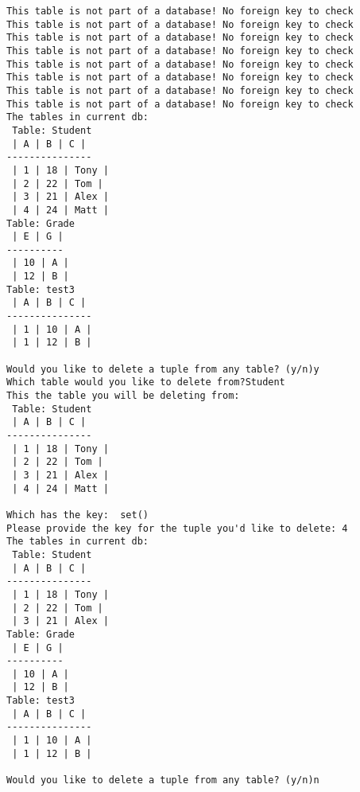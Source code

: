 \documentclass[11pt]{article}
\begin{document}
    \begin{Verbatim}[commandchars=\\\{\}]
This table is not part of a database! No foreign key to check
This table is not part of a database! No foreign key to check
This table is not part of a database! No foreign key to check
This table is not part of a database! No foreign key to check
This table is not part of a database! No foreign key to check
This table is not part of a database! No foreign key to check
This table is not part of a database! No foreign key to check
This table is not part of a database! No foreign key to check
The tables in current db: 
 Table: Student
 | A | B | C |
---------------
 | 1 | 18 | Tony | 
 | 2 | 22 | Tom | 
 | 3 | 21 | Alex | 
 | 4 | 24 | Matt | 
Table: Grade
 | E | G |
----------
 | 10 | A | 
 | 12 | B | 
Table: test3
 | A | B | C |
---------------
 | 1 | 10 | A | 
 | 1 | 12 | B | 

Would you like to delete a tuple from any table? (y/n)y
Which table would you like to delete from?Student
This the table you will be deleting from: 
 Table: Student
 | A | B | C |
---------------
 | 1 | 18 | Tony | 
 | 2 | 22 | Tom | 
 | 3 | 21 | Alex | 
 | 4 | 24 | Matt | 

Which has the key:  set()
Please provide the key for the tuple you'd like to delete: 4
The tables in current db: 
 Table: Student
 | A | B | C |
---------------
 | 1 | 18 | Tony | 
 | 2 | 22 | Tom | 
 | 3 | 21 | Alex | 
Table: Grade
 | E | G |
----------
 | 10 | A | 
 | 12 | B | 
Table: test3
 | A | B | C |
---------------
 | 1 | 10 | A | 
 | 1 | 12 | B | 

Would you like to delete a tuple from any table? (y/n)n

    \end{Verbatim}
\end{document}
